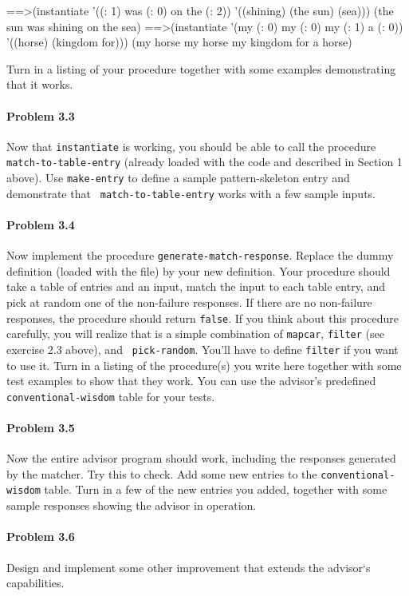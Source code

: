 \beginlisp
==>(instantiate
    '((: 1) was (: 0) on the (: 2))
    '((shining) (the sun) (sea)))
(the sun was shining on the sea)
\null
==>(instantiate
    '(my (: 0) my (: 0) my (: 1) a (: 0))
    '((horse) (kingdom for)))
(my horse my horse my kingdom for a horse)
\endlisp

\noindent
Turn in a listing of your procedure together with some examples
demonstrating that it works.

\paragraph{Problem 3.3}
Now that {\tt instantiate} is working, you should be able to call the
procedure {\tt match-to-table-entry} (already loaded with the code and
described in Section 1 above).  Use {\tt make-entry} to define a
sample pattern-skeleton entry and demonstrate that {\tt
match-to-table-entry} works with a few sample inputs.

\paragraph{Problem 3.4}
Now implement the procedure {\tt generate-match-response}.
Replace the dummy definition (loaded with the file) by your new
definition.  Your procedure should take a table of entries and an
input, match the input to each table entry, and pick at random one of
the non-failure responses.  If there are no non-failure responses, the
procedure should return {\tt false}.  If you think about this
procedure carefully, you will realize that is a simple combination of
{\tt mapcar}, {\tt filter} (see exercise 2.3 above), and {\tt
pick-random}.  You'll have to define {\tt filter} if you want to use
it.  Turn in a listing of the procedure(s) you write here together
with some test examples to show that they work.  You can use the
advisor's predefined {\tt conventional-wisdom} table for your tests.

\paragraph{Problem 3.5}
Now the entire advisor program should work, including the responses
generated by the matcher.  Try this to check.  Add some new
entries to the {\tt conventional-wisdom} table.  Turn in a few of the
new entries you added, together with some sample responses showing the
advisor in operation.

\paragraph{Problem 3.6}
Design and implement some other improvement that extends the advisor`s
capabilities. 

